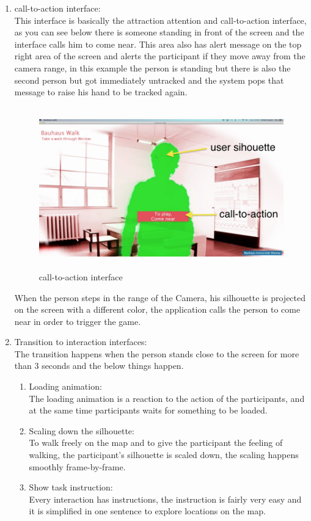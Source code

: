 \begin{enumerate}

\item call-to-action interface: \\

This interface is basically the attraction attention and call-to-action interface, as you can see below there is someone standing in front of the screen and the interface calls him to come near. This area also has alert message on the top right area of the screen and alerts the participant if they move away from the camera range, in this example the person is standing but there is also the second person but got immediately untracked and the system pops that message to raise his hand to be tracked again.

\begin{figure}[H]
    \centering
    \includegraphics[width=120mm,height=70mm]{Figures/6/body/first_interface}
    \caption{call-to-action interface}%
    \label{fig:body_firstinterface}%
\end{figure}

When the person steps in the range of the Camera, his silhouette is projected on the screen with a different color, the application calls the person to come near in order to trigger the game.

\item Transition to interaction interfaces: \\
The transition happens when the person stands close to the screen for more than 3 seconds and the below things happen.

\begin{enumerate}
\item Loading animation:\\
  The loading animation is a reaction to the action of the participants, and at the same time participants waits for something to be loaded.
\item Scaling down the silhouette: \\
To walk freely on the map and to give the participant the feeling of walking, the participant's silhouette is scaled down, the scaling happens smoothly frame-by-frame.
\item Show task instruction:  \\
Every interaction has instructions, the instruction is fairly very easy and it is simplified in one sentence to explore locations on the map.
\end{enumerate}


\end{enumerate}
